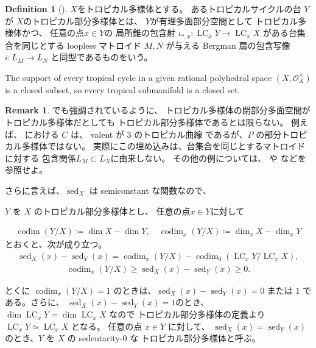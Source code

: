\documentclass[a4paper,dvipdfmx,reqno,12pt]{amsart}
\theoremstyle{definition}
\newtheorem{definition}[theorem]{Definition}
\newtheorem{remark}[theorem]{Remark}
\newcommand{\deq}{\coloneqq}
\newcommand{\opn}[1]{\operatorname{#1}}
\numberwithin{equation}{section}
\begin{document}
\begin{definition}[{\cite[Definition 2.14]{demedrano2023chern}}]
$X$をトロピカル多様体とする。
あるトロピカルサイクルの台 $Y$ が
$X$のトロピカル部分多様体とは、
$Y$が有理多面部分空間として
トロピカル多様体かつ、
任意の点$x\in Y$の
局所錐の包含射
$\iota_{*,x}\colon \opn{LC}_x Y\to 
\opn{LC}_x X$
がある台集合を同じとする loopless マトロイド
$M,N$ が与える Bergman 扇の包含写像
$i \colon L_M\to L_N$
と同型であるものをいう。
\end{definition}

The support of every tropical cycle in a given
rational polyhedral space $(X,\mathcal{O}_X^{\times})$ is
a closed subset, so every tropical submanifold is
a closed set.

\begin{remark}
\cite[Example 2.15]{demedrano2023chern}でも強調されているように、
トロピカル多様体の閉部分多面空間がトロピカル多様体だとしても
トロピカル部分多様体であるとは限らない。
例えば、
\cite[Example 2.21]{shaw2015tropical}
における $C$ は、 valent が $3$ のトロピカル曲線
であるが、$P$ の部分トロピカル多様体ではない。
実際にこの埋め込みは、台集合を同じとするマトロイドに対する
包含関係$L_M\subset L_N$に由来しない。
その他の例については、
\cite{MR2594592} や \cite{MR3339531}
などを参照せよ。


\end{remark}


さらに言えば、$\opn{sed}_X$ は
semiconstant な関数なので、




$Y$ を $X$ 
のトロピカル部分多様体とし、
任意の点$x\in Y$に対して

\begin{align}
\opn{codim}(Y/X)\deq \dim X -\dim Y,\quad 
\opn{codim}_x(Y/X)\deq \dim_x X -\dim_x Y
\end{align}
とおくと、次が成り立つ。
\begin{align}
\opn{sed}_X(x)-\opn{sed}_Y(x)=
\opn{codim}_x(Y/X)-\opn{codim}_0(\opn{LC}_x Y/\opn{LC}_xX),
\end{align}
\begin{align}
\opn{codim}_x(Y/X) \geq 
\opn{sed}_X(x)-\opn{sed}_Y(x)\geq 0.
\end{align}

とくに $\opn{codim}_x(Y/X)=1$
のときは、$\opn{sed}_X(x)-\opn{sed}_Y(x)=0$ または
$1$ である。さらに、
$\opn{sed}_X(x)-\opn{sed}_Y(x)=1$のとき、
$\dim \opn{LC}_x Y=\dim \opn{LC}_x X$
なので トロピカル部分多様体の定義より
$\opn{LC}_x Y\simeq \opn{LC}_x X$
となる。
任意の点 $x\in Y$ に対して、
$\opn{sed}_X(x)=\opn{sed}_Y(x)$ 
のとき、$Y$ を $X$ の sedentarity-0 な
トロピカル部分多様体と呼ぶ。 
\end{document}
